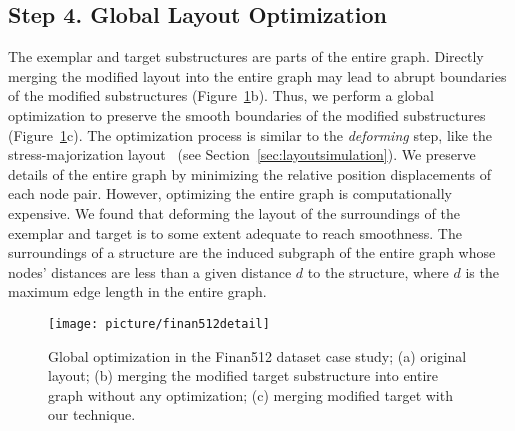 


\subsection{Step 4. Global Layout Optimization}
The exemplar and target substructures are parts of the entire graph. 
Directly merging 
the modified layout
into the entire graph may lead to abrupt boundaries of the modified substructures (Figure~\ref{fig:finan512detail}b). Thus, we perform a global optimization to preserve the smooth boundaries of the modified substructures (Figure~\ref{fig:finan512detail}c).
The optimization process is similar to the \textit{deforming} step,
like the stress-majorization layout~\cite{DBLP:conf/gd/GansnerKN04} (see Section~\ref{sec:layoutsimulation}).
We preserve details of the entire graph by minimizing the relative position displacements of each node pair. 
However, optimizing the entire graph is computationally expensive. 
We found that deforming the layout of the surroundings of the exemplar and target is to some extent adequate to reach smoothness. 
The surroundings of a structure are the induced subgraph of the entire graph whose nodes' distances are less than a given distance $d$ to the structure, 
where $d$ is the maximum edge length in the entire graph.

\begin{figure}[!tp]
    \centering
    \setlength{\belowcaptionskip}{-5pt}
    \texttt{[image: picture/finan512detail]}
    \caption{Global optimization in the Finan512 dataset case study; (a) original layout; (b) merging the modified target substructure into entire graph without any optimization; (c) merging modified target with our technique.}
    \label{fig:finan512detail}
\end{figure}

